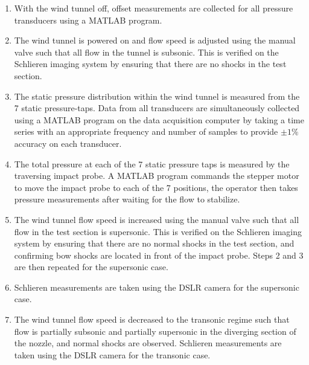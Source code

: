 \documentclass[runningheads]{llncs}
\begin{document}
\begin{enumerate}

    \item With the wind tunnel off, offset measurements are collected for all pressure transducers using a MATLAB program.

    \item The wind tunnel is powered on and flow speed is adjusted using the manual valve such that all flow in the tunnel is subsonic. This is verified on the Schlieren imaging system by ensuring that there are no shocks in the test section.

    \item The static pressure distribution within the wind tunnel is measured from the 7 static pressure-taps. Data from all transducers are simultaneously collected using a MATLAB program on the data acquisition computer by taking a time series with an appropriate frequency and number of samples to provide $\pm 1 \%$ accuracy on each transducer.
    
    \item The total pressure at each of the 7 static pressure taps is measured by the traversing impact probe. A MATLAB program commands the stepper motor to move the impact probe to each of the 7 positions, the operator then takes pressure measurements after waiting for the flow to stabilize.
    
    \item The wind tunnel flow speed is increased using the manual valve such that all flow in the test section is supersonic. This is verified on the Schlieren imaging system by ensuring that there are no normal shocks in the test section, and confirming bow shocks are located in front of the impact probe. Steps 2 and 3 are then repeated for the supersonic case.
    
    \item Schlieren measurements are taken using the DSLR camera for the supersonic case.
    
    \item The wind tunnel flow speed is decreased to the transonic regime such that flow is partially subsonic and partially supersonic in the diverging section of the nozzle, and normal shocks are observed. Schlieren measurements are taken using the DSLR camera for the transonic case.

\end{enumerate}


\end{document}
